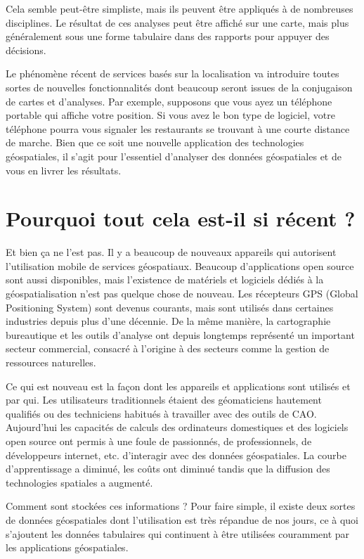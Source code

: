 Cela semble peut-être simpliste, mais ils peuvent être appliqués à de nombreuses disciplines. Le résultat de ces analyses peut être affiché sur une carte, mais plus généralement sous une forme tabulaire dans des rapports pour appuyer des décisions.

Le phénomène récent de services basés sur la localisation va introduire toutes sortes de nouvelles fonctionnalités dont beaucoup seront issues de la conjugaison de cartes et d'analyses. Par exemple, supposons que vous ayez un téléphone portable qui affiche votre position. Si vous avez le bon type de logiciel, votre téléphone pourra vous signaler les restaurants se trouvant à une courte distance de marche. Bien que ce soit une nouvelle application des technologies géospatiales, il s'agit pour l'essentiel d'analyser des données géospatiales et de vous en livrer les résultats.

\section{Pourquoi tout cela est-il si récent ?}\label{label_whynew}
Et bien ça ne l'est pas. Il y a beaucoup de nouveaux appareils qui autorisent l'utilisation mobile de services géospatiaux. Beaucoup d'applications open source sont aussi disponibles, mais l'existence de matériels et logiciels dédiés à la géospatialisation n'est pas quelque chose de nouveau. Les récepteurs GPS (Global Positioning System) sont devenus courants, mais sont utilisés dans certaines industries depuis plus d'une décennie. De la même manière, la cartographie bureautique et les outils d'analyse ont depuis longtemps représenté un important secteur commercial, consacré à l'origine à des secteurs comme la gestion de ressources naturelles.

Ce qui est nouveau est la façon dont les appareils et applications sont utilisés et par qui. Les utilisateurs traditionnels étaient des géomaticiens hautement qualifiés ou des techniciens habitués à travailler avec des outils de CAO. Aujourd'hui les capacités de calculs des ordinateurs domestiques et des logiciels open source ont permis à une foule de passionnés, de professionnels, de développeurs internet, etc. d'interagir avec des données géospatiales. La courbe d'apprentissage a diminué, les coûts ont diminué tandis que la diffusion des technologies spatiales a augmenté.

Comment sont stockées ces informations ? Pour faire simple, il existe deux sortes de données géospatiales dont l'utilisation est très répandue de nos jours, ce à quoi s'ajoutent les données tabulaires qui continuent à être utilisées couramment par les applications géospatiales.


